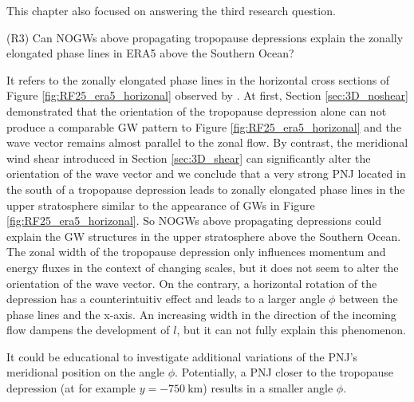 This chapter also focused on answering the third research question.
\begin{tcolorbox}[]
    (R3) Can NOGWs above propagating tropopause depressions explain the zonally elongated phase lines in ERA5 above the Southern Ocean?
\end{tcolorbox}
It refers to the zonally elongated phase lines in the horizontal cross sections of Figure \ref{fig:RF25_era5_horizonal} observed by \textcite[]{dornbrack_stratospheric_2022}. At first, Section \ref{sec:3D_noshear} demonstrated that the orientation of the tropopause depression alone can not produce a comparable GW pattern to Figure \ref{fig:RF25_era5_horizonal} and the wave vector remains almost parallel to the zonal flow. By contrast, the meridional wind shear introduced in Section \ref{sec:3D_shear} can significantly alter the orientation of the wave vector and we conclude that a very strong PNJ located in the south of a tropopause depression leads to zonally elongated phase lines in the upper stratosphere similar to the appearance of GWs in Figure \ref{fig:RF25_era5_horizonal}. So NOGWs above propagating depressions could explain the GW structures in the upper stratosphere above the Southern Ocean. \\
The zonal width of the tropopause depression only influences momentum and energy fluxes in the context of changing scales, but it does not seem to alter the orientation of the wave vector. On the contrary, a horizontal rotation of the depression has a counterintuitiv effect and leads to a larger angle $\phi$ between the phase lines and the x-axis. An increasing width in the direction of the incoming flow dampens the development of $l$, but it can not fully explain this phenomenon.   

It could be educational to investigate additional variations of the PNJ's meridional position on the angle $\phi$. Potentially, a PNJ closer to the tropopause depression (at for example $y=\SI{-750}{\kilo\meter}$) results in a smaller angle $\phi$.


